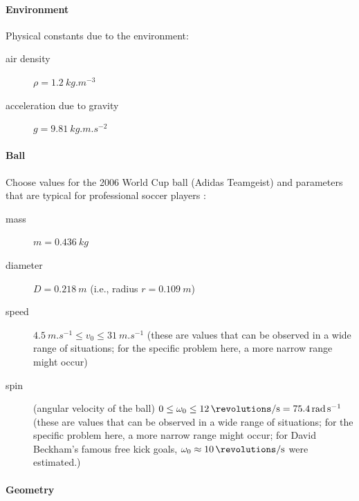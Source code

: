 \documentclass[letterpaper]{scrartcl}
\begin{document}
\paragraph{Environment}

Physical constants due to the environment:
\begin{description}
\item[air density] $\rho = \SI{1.2}{kg.m^{-3}}$
\item[acceleration due to gravity] $g = \SI{9.81}{kg.m.s^{-2}}$
\end{description}

\paragraph{Ball}

Choose values for the 2006 World Cup ball (Adidas Teamgeist)
\citep{Goff:2010aa} and parameters that are typical for professional
soccer players \citep{Goff:2009aa}:
\begin{description}
\item[mass] $m = \SI{0.436}{kg}$
\item[diameter] $D = \SI{0.218}{m}$ (i.e., radius $r = \SI{0.109}{m}$)
\item[speed]
  $\SI{4.5}{m.s^{-1}} \le v_{0} \le \SI{31}{m.s^{-1}}$ (these are
  values that can be observed in a wide range of situations; for the
  specific problem here, a more narrow range might occur)
\item[spin] (angular velocity of the ball)
  $0 \le \omega_{0} \le \SI{12}{\revolutions\per\second} =
  \SI{75.4}{rad.s^{-1}}$ (these are values that can be observed in a
  wide range of situations; for the specific problem here, a more
  narrow range might occur; for David Beckham's famous free kick
  goals, $\omega_{0} \approx \SI{10}{\revolutions\per\second}$ were
  estimated.)
\end{description}


\paragraph{Geometry}
\end{document}
